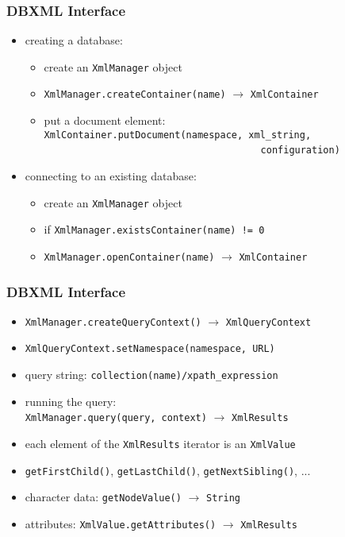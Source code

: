 \documentclass[dvipsnames]{beamer}
\theoremstyle{plain}
\begin{document}
\begin{frame}
  \frametitle{DBXML Interface}

  \begin{itemize}
    \item creating a database:\\
    \begin{itemize}
      \item create an \lstinline!XmlManager! object
      \item \lstinline!XmlManager.createContainer(name)!
        $\rightarrow$ \lstinline!XmlContainer!
      \item put a document element:\\
        \lstinline!XmlContainer.putDocument(namespace, xml_string,!\\
        ~~~~~~~~~~~~~~~~~~~~~~~~~~~~~~~~~~~~~~~\lstinline!configuration)!
    \end{itemize}

    \pause
    \item connecting to an existing database:\\
    \begin{itemize}
      \item create an \lstinline!XmlManager! object
      \item if \lstinline?XmlManager.existsContainer(name) != 0?
      \item \lstinline!XmlManager.openContainer(name)!
        $\rightarrow$ \lstinline!XmlContainer!
    \end{itemize}
  \end{itemize}
\end{frame}

\begin{frame}
  \frametitle{DBXML Interface}

  \begin{itemize}
    \item \lstinline!XmlManager.createQueryContext()!
      $\rightarrow$ \lstinline!XmlQueryContext!
    \item \lstinline!XmlQueryContext.setNamespace(namespace, URL)!

    \pause
    \item query string: \lstinline!collection(name)/xpath_expression!
    \item running the query:\\
      \lstinline!XmlManager.query(query, context)!
      $\rightarrow$ \lstinline!XmlResults!

    \pause
    \medskip
    \item each element of the \lstinline!XmlResults! iterator is an
      \lstinline!XmlValue!
    \item \lstinline!getFirstChild()!, \lstinline!getLastChild()!,
      \lstinline!getNextSibling()!, ...
    \item character data: \lstinline!getNodeValue()!
      $\rightarrow$ \lstinline!String!
    \item attributes:
      \lstinline!XmlValue.getAttributes()! $\rightarrow$ \lstinline!XmlResults!
  \end{itemize}
\end{frame}
\end{document}
